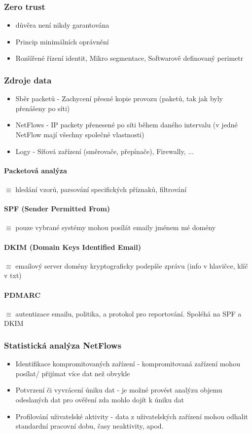 \documentclass[10pt,a4paper]{article}
\begin{document}
\subsubsection*{Zero trust}
\begin{itemize}
    \item důvěra není nikdy garantována
    \item Princip minimálních oprávnění
    \item Rozšířené řízení identit, Mikro segmentace, Softwarově definovaný perimetr
\end{itemize}

\subsubsection*{Zdroje data}
\begin{itemize}
    \item Sběr packetů - Zachycení přesné kopie provozu (paketů, tak jak byly přenášeny po síti)
    \item NetFlows - IP packety přenesené po síti během daného intervalu (v jedné NetFlow mají všechny společné vlastnosti)
    \item Logy - Síťová zařízení (směrovače, přepínače), Firewally, ...
\end{itemize}

\paragraph*{Packetová analýza} $\equiv$ hledání vzorů, parsování specifických příznaků, filtrování
\paragraph*{SPF (Sender Permitted From)} $\equiv$ pouze vybrané systémy mohou posílát emaily jménem mé domény
\paragraph*{DKIM (Domain Keys Identified Email)} $\equiv$ emailový server domény kryptograficky podepíše zprávu (info v hlavičce, klíč v txt)
\paragraph*{PDMARC} $\equiv$ autentizace emailu, politika, a protokol pro reportování. Spoléhá na SPF a DKIM


\subsubsection*{Statistická analýza NetFlows}
\begin{itemize}
    \item Identifikace kompromitovaných zařízení - kompromitovaná zařízení mohou posílat/ přijímat více dat než obvykle
    \item Potvrzení či vyvrácení úniku dat - je možné provést analýzu objemu odeslaných dat pro ověření zda mohlo dojít k úniku dat
    \item Profilování uživatelské aktivity - data z uživatelských zařízení mohou odhalit standardní pracovní dobu, časy neaktivity, apod.
\end{itemize}
\end{document}
